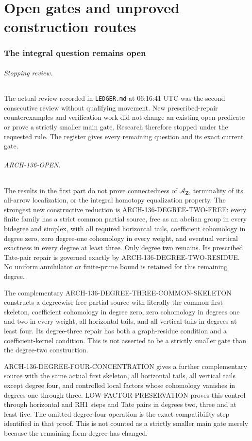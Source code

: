 \documentclass[11pt,a4paper]{article}
\begin{document}
\clearpage
\part{Open gates and unproved construction routes}
\section{The integral question remains open}
\paragraph{Stopping review.}
The actual review recorded in \texttt{LEDGER.md} at 06:16:41 UTC
was the second consecutive review without qualifying movement.
New prescribed-repair counterexamples and verification work did not
change an existing open predicate or prove a strictly smaller main
gate. Research therefore stopped under the requested rule. The
register gives every remaining question and its exact current gate.

\paragraph{ARCH-136-OPEN.}
The results in the first part do not prove connectedness of
$\mathcal A_{\mathbf Z}$, terminality of its all-arrow localization,
or the integral homotopy equalization property. The strongest new
constructive reduction is ARCH-136-DEGREE-TWO-FREE: every finite family
has a strict common partial source, free as an abelian group in every
bidegree and simplex, with all required horizontal tails, coefficient
cohomology in degree zero, zero degree-one cohomology in every weight,
and eventual vertical exactness in every degree at least three.
Only degree two remains. Its prescribed Tate-pair repair is governed
exactly by ARCH-136-DEGREE-TWO-RESIDUE. No uniform annihilator or
finite-prime bound is retained for this remaining degree.

The complementary ARCH-136-DEGREE-THREE-COMMON-SKELETON constructs
a degreewise free partial source with literally the common first skeleton,
coefficient cohomology in degree zero, zero cohomology in degrees one and
two in every weight, all horizontal tails, and all vertical tails in
degrees at least four. Its degree-three repair has both a graph-residue
condition and a coefficient-kernel condition. This is not asserted to
be a strictly smaller gate than the degree-two construction.

ARCH-136-DEGREE-FOUR-CONCENTRATION gives a further complementary
source with the same actual first skeleton, all horizontal tails,
all vertical tails except degree four, and controlled local factors
whose cohomology vanishes in degrees one through three.
LOW-FACTOR-PRESERVATION proves this control through horizontal and
RH1 steps and Tate pairs in degrees two, three and at least five.
The omitted degree-four operation is the exact compatibility step
identified in that proof. This is not counted as a strictly smaller
main gate merely because the remaining form degree has changed.
\end{document}
